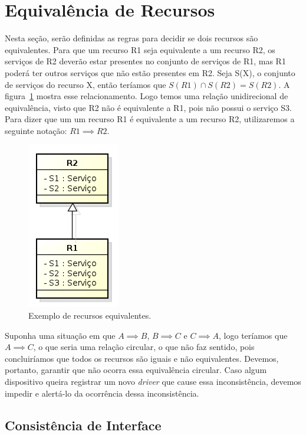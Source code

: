 \section{Equivalência de Recursos}

	Nesta seção, serão definidas as regras para decidir se dois recursos são equivalentes. Para que um recurso R1 seja equivalente a um recurso R2, os serviços de R2 deverão estar presentes no conjunto de serviços de R1, mas R1 poderá ter outros serviços que não estão presentes em R2. Seja S(X), o conjunto de serviços do recurso X, então teríamos que $S(R1) \cap S(R2) = S(R2)$. 
	A figura~\ref{fig:equivalenciaDeRecursos} mostra esse relacionamento.
	Logo temos uma relação unidirecional de equivalência, visto que R2 não é equivalente a R1, pois não possui o serviço S3. Para dizer que um um recurso R1 é equivalente a um recurso R2, utilizaremos a seguinte notação: $R1 \implies R2$.
	
	\begin{figure}[ht]
		\center
		\includegraphics[scale=0.6]{imagens/equivalenciaDeRecursos}
		\caption{Exemplo de recursos equivalentes.}
		\label{fig:equivalenciaDeRecursos}
	\end{figure}

	Suponha uma situação em que $A \implies B$, $B \implies C$ e $C \implies A$, logo teríamos que $A \implies C$, o que seria uma relação circular, o que não faz sentido, pois concluiríamos que todos os recursos são iguais e não equivalentes. Devemos, portanto, garantir que não ocorra essa equivalência circular. Caso algum dispositivo queira registrar um novo \emph{driver} que cause essa inconsistência, devemos impedir e alertá-lo da ocorrência dessa inconsistência. 

\subsection{Consistência de Interface}

